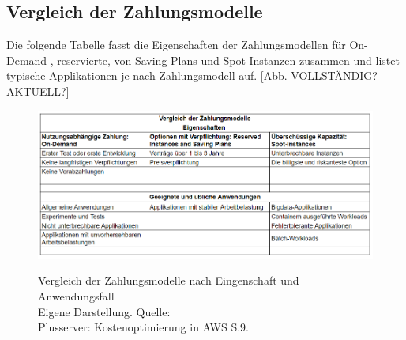 \subsection*{Vergleich der Zahlungsmodelle}
Die folgende Tabelle fasst die Eigenschaften der Zahlungsmodellen für On-Demand-, reservierte, von Saving Plans und Spot-Instanzen zusammen und listet typische Applikationen je nach Zahlungsmodell auf.
[Abb. VOLLSTÄNDIG?AKTUELL?]
\begin{figure}[h!]
    \centering
    \includegraphics[scale=0.63]{sources/Vergleich_der_Zahlungsmodelle}\label{fig:Vergleich_der_Zahlungsmodelle}\\
    \caption[Vergleich der Zahlungsmodelle]{}
    \label{fig:Vergleich_der_Zahlungsmodelle}  Vergleich der Zahlungsmodelle nach Eingenschaft und Anwendungsfall\\
Eigene Darstellung. Quelle: {\cite{AMZ02, AMZ07, AMZ11, AMZ19,SPOT1}}\\
{Plusserver: Kostenoptimierung in AWS S.9.\cite{PS1}}
  \end{figure}
%

\newpage
